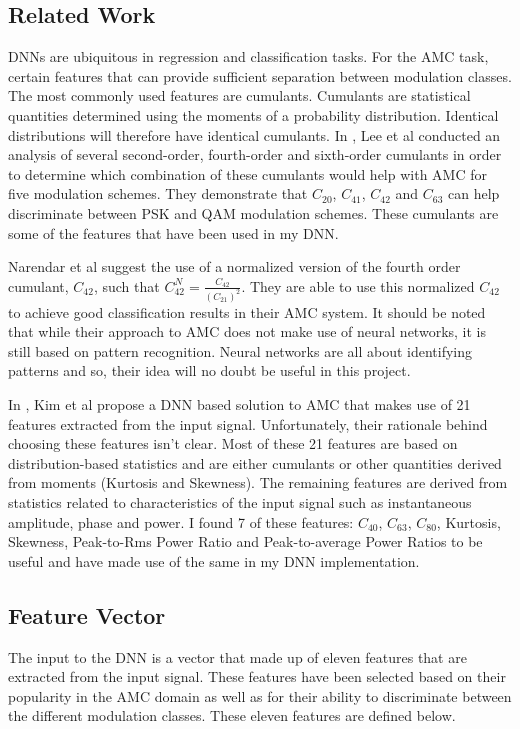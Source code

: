 \documentclass[journal,onecolumn]{IEEEtran}
\begin{document}
\subsection{Related Work}

DNNs are ubiquitous in regression and classification tasks. For the AMC task, certain features that can provide sufficient separation between modulation classes. The most commonly used features are cumulants. Cumulants are statistical quantities determined using the moments of a probability distribution. Identical distributions will therefore have identical cumulants. In \cite{ann1}, Lee et al conducted an analysis of several second-order, fourth-order and sixth-order cumulants in order to determine which combination of these cumulants would help with AMC for five modulation schemes. They demonstrate that $C_{20}$, $C_{41}$, $C_{42}$ and $C_{63}$ can help discriminate between PSK and QAM modulation schemes. These cumulants are some of the features that have been used in my DNN.

Narendar et al \cite{c42norm} suggest the use of a normalized version of the fourth order cumulant, $C_{42}$, such that $C^N_{42}=\frac{C_{42}}{\left(C_{21}\right)^2}$. They are able to use this normalized $C_{42}$ to achieve good classification results in their AMC system. It should be noted that while their approach to AMC does not make use of neural networks, it is still based on pattern recognition. Neural networks are all about identifying patterns and so, their idea will no doubt be useful in this project.

In \cite{ann2}, Kim et al propose a DNN based solution to AMC that makes use of 21 features extracted from the input signal. Unfortunately, their rationale behind choosing these features isn't clear. Most of these 21 features are based on distribution-based statistics and are either cumulants or other quantities derived from moments (Kurtosis and Skewness). The remaining features are derived from statistics related to characteristics of the input signal such as instantaneous amplitude, phase and power. I found 7 of these features: $C_{40}$, $C_{63}$, $C_{80}$, Kurtosis, Skewness, Peak-to-Rms Power Ratio and Peak-to-average Power Ratios to be useful and have made use of the same in my DNN implementation.

\subsection{Feature Vector}

The input to the DNN is a vector that made up of eleven features that are extracted from the input signal. These features have been selected based on their popularity in the AMC domain as well as for their ability to discriminate between the different modulation classes. These eleven features are defined below.
\end{document}
